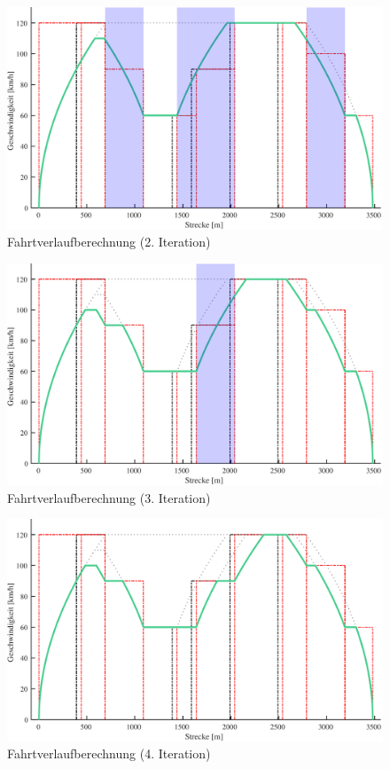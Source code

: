\begin{figure}
\includegraphics[width=\linewidth]{../images/matlab/it4.pdf}
\caption{Fahrtverlaufberechnung (2. Iteration)}
\label{fig:it4}
\end{figure}
\begin{figure}
\includegraphics[width=\linewidth]{../images/matlab/it5.pdf}
\caption{Fahrtverlaufberechnung (3. Iteration)}
\label{fig:it5}
\end{figure}
\begin{figure}
\includegraphics[width=\linewidth]{../images/matlab/it6.pdf}
\caption{Fahrtverlaufberechnung (4. Iteration)}
\label{fig:it6}
\end{figure}
